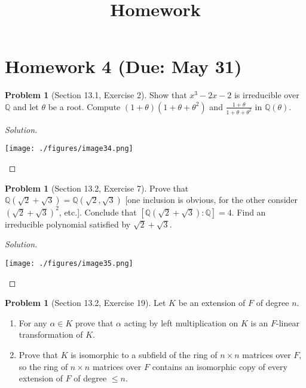 \documentclass{amsart}
\title{Homework}
\numberwithin{equation}{section}
\theoremstyle{definition}
\newtheorem{problem}[thm]{Problem}
\begin{document}


\section*{Homework 4 (Due: May 31)}

\begin{problem}[Section 13.1, Exercise 2]
  Show that \(x^3-2 x-2\) is irreducible over \(\mathbb{Q}\) and let \(\theta\) be a root. Compute \((1+\theta)\left(1+\theta+\theta^2\right)\) and \(\frac{1+\theta}{1+\theta+\theta^2}\) in \(\mathbb{Q}(\theta)\).
\end{problem}

\begin{proof}[Solution]\
\begin{center}
  \texttt{[image: ./figures/image34.png]}
\end{center}
\end{proof}



\begin{problem}[Section 13.2, Exercise 7]
  Prove that \(\mathbb{Q}(\sqrt{2}+\sqrt{3})=\mathbb{Q}(\sqrt{2}, \sqrt{3})\) [one inclusion is obvious, for the other consider \((\sqrt{2}+\sqrt{3})^2\), etc.]. Conclude that \([\mathbb{Q}(\sqrt{2}+\sqrt{3}): \mathbb{Q}]=4\). Find an irreducible polynomial satisfied by \(\sqrt{2}+\sqrt{3}\).
\end{problem}

\begin{proof}[Solution]\
\begin{center}
  \texttt{[image: ./figures/image35.png]}
\end{center}
\end{proof}


\begin{problem}[Section 13.2, Exercise 19]
Let \(K\) be an extension of \(F\) of degree \(n\).
\begin{enumerate}
\item For any \(\alpha \in K\) prove that \(\alpha\) acting by left multiplication on \(K\) is an \(F\)-linear transformation of \(K\).
\item Prove that \(K\) is isomorphic to a subfield of the ring of \(n \times n\) matrices over \(F\), so the ring of \(n \times n\) matrices over \(F\) contains an isomorphic copy of every extension of \(F\) of degree \(\leq n\).
\end{enumerate}

\end{problem}
\end{document}
